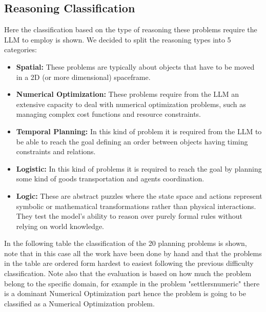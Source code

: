 \documentclass[a4paper]{article}
\begin{document}
    \subsection{Reasoning Classification}
    Here the classification based on the type of reasoning these problems require the LLM to employ is shown. We decided to split the reasoning types into 5 categories:
    \begin{itemize}
        \item \textbf{Spatial:} These problems are typically about objects that have to be moved in a 2D (or more dimensional) spaceframe.
        \item \textbf{Numerical Optimization:} These problems require from the LLM an extensive capacity to deal with numerical optimization problems, such as managing complex cost functions and resource constraints.
        \item \textbf{Temporal Planning:} In this kind of problem it is required from the LLM to be able to reach the goal defining an order between objects having timing constraints and relations.
        \item \textbf{Logistic:} In this kind of problems it is required to reach the goal by planning some kind of goods transportation and agents coordination.
        \item \textbf{Logic:} These are abstract puzzles where the state space and actions represent symbolic or mathematical transformations rather than physical interactions. They test the model's ability to reason over purely formal rules without relying on world knowledge.
    \end{itemize}

    In the following table the classification of the 20 planning problems is shown, note that in this case all the work have been done by hand and that the problems in the table are ordered form hardest to easiest following the previous difficulty classification. Note also that the evaluation is based on how much the problem belong to the specific domain, for example in the problem "settlersnumeric" there is a dominant Numerical Optimization part hence the problem is going to be classified as a Numerical Optimization problem.
    
\end{document}
